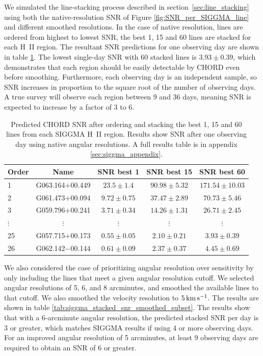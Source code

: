 We simulated the line-stacking process described in section~\ref{sec:line_stacking} using both the native-resolution SNR of Figure \ref{fig:SNR_per_SIGGMA_line} and different smoothed resolutions. In the case of native resolution, lines are ordered from highest to lowest SNR, the best 1, 15 and 60 lines are stacked for each H~II region. The resultant SNR predictions for one observing day are shown in table \ref{tab:siggma_stacked_snr_subset}. The lowest single-day SNR with 60 stacked lines is \(3.93 \pm 0.39\), which demonstrates that each region should be easily detectable by CHORD even before smoothing. Furthermore, each observing day is an independent sample, so SNR increases in proportion to the square root of the number of observing days. A true survey will observe each region between 9 and 36 days, meaning SNR is expected to increase by a factor of 3 to 6. 
\begin{table}[H]
    \centering
    \begin{tabular}{l c c c c}
        \toprule
        Order & Name  & SNR best 1 & SNR best 15 & SNR best 60 \\
        \midrule
        1 & G063.164$+$00.449 & $23.5 \pm 1.4$ & $90.98 \pm 5.32$ & $171.54 \pm 10.03$ \\
        2 & G061.473$+$00.094 & $9.72 \pm 0.75$ & $37.47 \pm 2.89$ & $70.73 \pm 5.46$ \\
        3 & G059.796$+$00.241 & $3.71 \pm 0.34$ & $14.26 \pm 1.31$ & $26.71 \pm 2.45$ \\
        $\vdots$ & $\vdots$ & $\vdots$ & $\vdots$ & $\vdots$ \\
        25 & G057.715$+$00.173 & $0.55 \pm 0.05$ & $2.10 \pm 0.21$ & $3.93 \pm 0.39$ \\
        26 & G062.142$-$00.144 & $0.61 \pm 0.09$ & $2.37 \pm 0.37$ & $4.45 \pm 0.69$ \\
        \bottomrule
    \end{tabular}
    \caption[SNR after stacking the best 1, 15 and 60 lines for CHORD observations of SIGGMA H~II regions]{Predicted CHORD SNR after ordering and stacking the best 1, 15 and 60 lines from each SIGGMA H~II region. Results show SNR after one observing day using native angular resolutions. A full results table is in appendix \ref{sec:siggma_appendix}.}
    \label{tab:siggma_stacked_snr_subset}
\end{table}

We also considered the case of prioritizing angular resolution over sensitivity by only including the lines that meet a given angular resolution cutoff. We selected angular resolutions of 5, 6, and 8 arcminutes, and smoothed the available lines to that cutoff. We also smoothed the velocity resolution to \(5 \, \mathrm{km} \, \mathrm{s}^{-1}\). The results are shown in table \ref{tab:siggma_stacked_snr_smoothed_subset}. The results show that with a 6-arcminute angular resolution, the predicted stacked SNR per day is 3 or greater, which matches SIGGMA results if using 4 or more observing days. For an improved angular resolution of 5 arcminutes, at least 9 observing days are required to obtain an SNR of 6 or greater.

